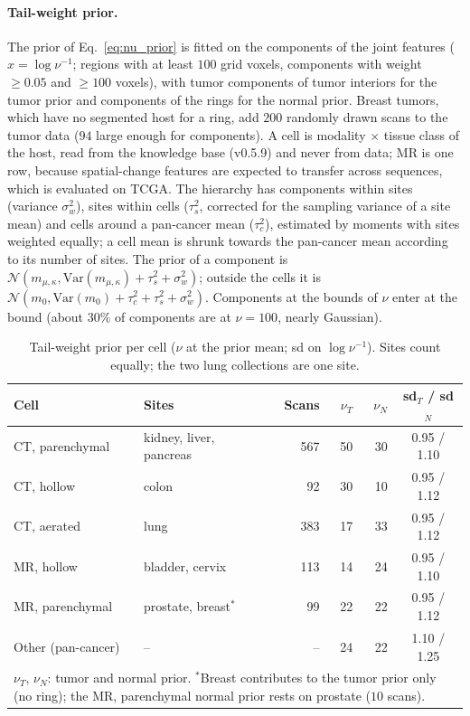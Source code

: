 \documentclass[fleqn,10pt]{olplainarticle}
\begin{document}
\paragraph{Tail-weight prior.} The prior of Eq.~\eqref{eq:nu_prior} is fitted on the components of the joint features
($x=\log\nu^{-1}$; regions with at least $100$ grid voxels, components with weight $\ge0.05$ and $\ge100$ voxels), with tumor
components of tumor interiors for the tumor prior and components of the rings for the normal prior. Breast tumors, which have
no segmented host for a ring, add $200$ randomly drawn scans to the tumor data ($94$ large enough for components). A cell is
modality $\times$ tissue class of the host, read from the knowledge base (v0.5.9) and never from data; MR is one row, because
spatial-change features are expected to transfer across sequences, which is evaluated on TCGA. The hierarchy has components
within sites (variance $\sigma^2_w$), sites within cells ($\tau^2_s$, corrected for the sampling variance of a site mean) and
cells around a pan-cancer mean ($\tau^2_c$), estimated by moments with sites weighted equally; a cell mean is shrunk towards
the pan-cancer mean according to its number of sites. The prior of a component is $\mathcal{N}(m_{\mu,\kappa},
\mathrm{Var}(m_{\mu,\kappa})+\tau^2_s+\sigma^2_w)$; outside the cells it is $\mathcal{N}(m_0,\mathrm{Var}(m_0)+\tau^2_c+\tau^2_s+\sigma^2_w)$.
Components at the bounds of $\nu$ enter at the bound (about $30\%$ of components are at $\nu=100$, nearly Gaussian).

\begin{table}[t]
\centering\small
\caption{Tail-weight prior per cell ($\nu$ at the prior mean; sd on $\log\nu^{-1}$). Sites count equally; the two lung
collections are one site.}
\label{tab:nu_prior}
\setlength{\tabcolsep}{4pt}
\begin{tabular}{llrrrc}
\hline
Cell & Sites & Scans & $\nu_T$ & $\nu_N$ & sd$_T$ / sd$_N$\\
\hline
CT, parenchymal & kidney, liver, pancreas & 567 & 50 & 30 & 0.95 / 1.10\\
CT, hollow & colon & 92 & 30 & 10 & 0.95 / 1.12\\
CT, aerated & lung & 383 & 17 & 33 & 0.95 / 1.12\\
MR, hollow & bladder, cervix & 113 & 14 & 24 & 0.95 / 1.10\\
MR, parenchymal & prostate, breast$^*$ & 99 & 22 & 22 & 0.95 / 1.12\\
Other (pan-cancer) & -- & -- & 24 & 22 & 1.10 / 1.25\\
\hline
\multicolumn{6}{p{0.9\linewidth}}{\footnotesize $\nu_T$, $\nu_N$: tumor and normal prior. $^*$Breast contributes to the tumor prior only (no ring); the MR, parenchymal normal prior rests on prostate ($10$ scans).}\\
\end{tabular}
\end{table}
\end{document}
